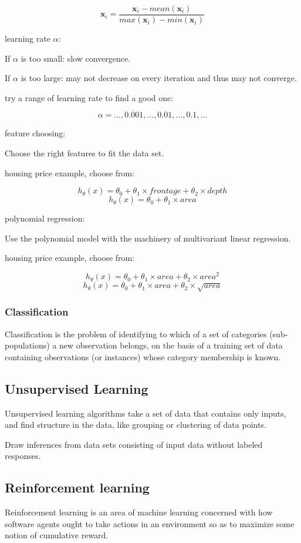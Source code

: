 \documentclass{article}
\begin{document}
\[\textbf{x}_i = \frac{\textbf{x}_i - mean(\textbf{x}_i)}{max(\textbf{x}_i) - min(\textbf{x}_i)}\]

\noindent learning rate \(\alpha\):

\noindent If \(\alpha\) is too small: slow convergence.

\noindent If \(\alpha\) is too large: may not decrease on every iteration and thus may not converge.

\noindent try a range of learning rate to find a good one:

\[\alpha = \dots, 0.001, \dots, 0.01, \dots, 0.1, \dots\]

\noindent feature choosing:

\noindent Choose the right features to fit the data set.

\noindent housing price example, choose from:

\[h_{\theta}(x) = \theta_0 + \theta_1 \times frontage + \theta_2 \times depth\]
\[h_{\theta}(x) = \theta_0 + \theta_1 \times area\]

\noindent polynomial regression:

\noindent Use the polynomial model with the machinery of multivariant linear regression.

\noindent housing price example, choose from:

\[h_{\theta}(x) = \theta_0 + \theta_1 \times area + \theta_2 \times area^2\]
\[h_{\theta}(x) = \theta_0 + \theta_1 \times area + \theta_2 \times \sqrt{area}\]

\subsubsection{Classification}

Classification is the problem of identifying to which 
of a set of categories (sub-populations) a new observation 
belongs, on the basis of a training set of data containing 
observations (or instances) whose category membership is known.

\subsection{Unsupervised Learning}

Unsupervised learning algorithms take a set of data that 
contains only inputs, and find structure in the data, like 
grouping or clustering of data points.

\bigskip

\noindent Draw inferences from data sets consisting of input 
data without labeled responses.

\subsection{Reinforcement learning}
       
Reinforcement learning is an area of machine learning concerned 
with how software agents ought to take actions in an environment 
so as to maximize some notion of cumulative reward.

\printindex
\end{document}
